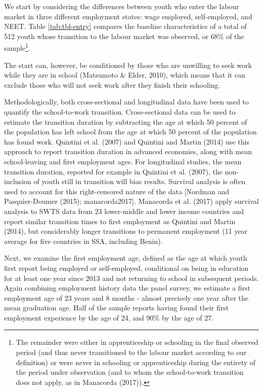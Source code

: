 \documentclass[
  11pt,
a4paper
]{article}
\begin{document}
We start by considering the differences between youth who enter the labour market in three different employment states: wage employed, self-employed, and NEET. Table \ref{tab:tbl-entry} compares the baseline characteristics of a total of 512 youth whose transition to the labour market was observed, or 68\% of the sample\footnote{The remainder were either in apprenticeship or schooling in the final observed period (and thus never transitioned to the labour market according to our definition) or were never in schooling or apprenticeship during the entirety of the period under observation (and to whom the school-to-work transition does not apply, as in Manacorda (2017)).}.

The start can, however, be conditioned by those who are unwilling to seek work while they are in school (Matsumoto \& Elder, 2010), which means that it can exclude those who will not seek work after they finish their schooling.

Methodologically, both cross-sectional and longitudinal data have been used to quantify the school-to-work transition. Cross-sectional data can be used to estimate the transition duration by subtracting the age at which 50 percent of the population has left school from the age at which 50 percent of the population has found work. Quintini et al. (2007) and Quintini and Martin (2014) use this approach to report transition duration in advanced economies, along with mean school-leaving and first employment ages. For longitudinal studies, the mean transition duration, reported for example in Quintini et al. (2007), the non-inclusion of youth still in transition will bias results. Survival analysis is often used to account for this right-censored nature of the data {[}Nordman and Pasquier-Doumer (2015); manacorda2017{]}. Manacorda et al. (2017) apply survival analysis to SWTS data from 23 lower-middle and lower income countries and report similar transition times to first employment as Quintini and Martin (2014), but considerably longer transitions to permanent employment (11 year average for five countries in SSA, including Benin).

Next, we examine the first employment age, defined as the age at which youth first report being employed or self-employed, conditional on being in education for at least one year since 2013 and not returning to school in subsequent periods. Again combining employment history data the panel survey, we estimate a first employment age of 23 years and 8 months - almost precisely one year after the mean graduation age. Half of the sample reports having found their first employment experience by the age of 24, and 90\% by the age of 27.
\end{document}

